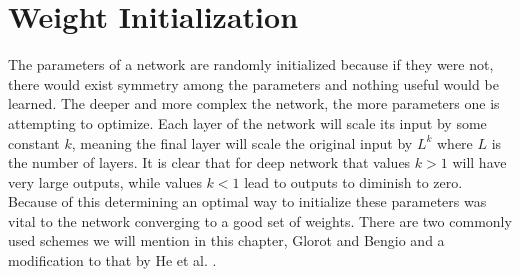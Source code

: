\section{Weight Initialization}
The parameters of a network are randomly initialized because if they were not, there would exist symmetry among the parameters and nothing useful would be learned.
The deeper and more complex the network, the more parameters one is attempting to optimize.
Each layer of the network will scale its input by some constant $k$, meaning the final layer will scale the original input by $L^k$ where $L$ is the number of layers.
It is clear that for deep network that values $k > 1$ will have very large outputs, while values $k < 1$ lead to outputs to diminish to zero.
Because of this determining an optimal way to initialize these parameters was vital to the network converging to a good set of weights.
There are two commonly used schemes we will mention in this chapter, Glorot and Bengio \cite{glorot2010understanding} and a modification to that by He et al. \cite{he2015delving}.

